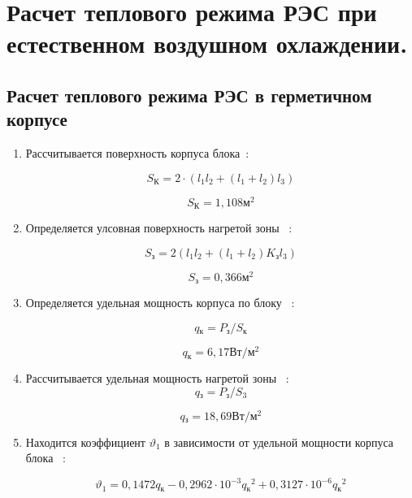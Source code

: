 \section{Расчет теплового режима РЭС при естественном воздушном охлаждении.}
\subsection{Расчет теплового режима РЭС в герметичном корпусе}
\begin{enumerate}[label={\arabic*.}]
  
\item Рассчитывается поверхность корпуса блока~\cite{Rotkop1976}:

  \begin{equation}
    S\mathrm{_{К}} = 2 \cdot (l_1 l_2 + (l_1+ l_2)l_3)
  \end{equation}

  $$S\mathrm{_{К}}=1,108\mathrm{м^2}$$

\item Определяется улсовная поверхность нагретой зоны ~\cite{Rotkop1976}:

  \begin{equation}
    S\mathrm{_{з}} = 2 (l_1 l_2 + (l_1 + l_2) K\mathrm{_{з}} l_3)
  \end{equation}

  $$S\mathrm{_{з}} = 0,366\mathrm{м^2}$$

\item Определяется удельная мощность корпуса по блоку ~\cite{Rotkop1976}:

\begin{equation}
  q\mathrm{_к} = P\mathrm{_з}/S\mathrm{_к}
\end{equation}

$$q\mathrm{_к} = 6,17\mathrm{Вт/м^2}$$

\item Рассчитывается удельная мощность нагретой зоны ~\cite{Rotkop1976}:
  \begin{equation}
      q\mathrm{_з} = P\mathrm{_з}/S\mathrm{_3}
    \end{equation}

    $$q\mathrm{_з} = 18,69 \mathrm{ Вт/м^2}$$

  \item Находится коэффициент $\vartheta_1$ в зависимости от удельной мощности корпуса блока ~\cite{Rotkop1976}:
    
\begin{equation}
\vartheta_1 = 0,1472q\mathrm{_к} - 0,2962 \cdot 10^{-3}q\mathrm{_к}^2 + 0,3127 \cdot 10^{-6}q\mathrm{_к}^2
\end{equation}


\end{enumerate}
